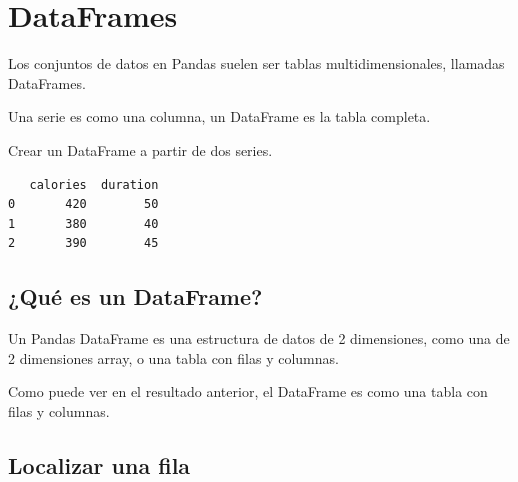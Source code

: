 \section{DataFrames}

Los conjuntos de datos en Pandas suelen ser tablas multidimensionales, llamadas DataFrames.

Una serie es como una columna, un DataFrame es la tabla completa. \\

\begin{code} Crear un DataFrame a partir de dos series.

\begin{Shaded}
\begin{Highlighting}[]

\OperatorTok{=}\NormalTok{ \{}
  \NormalTok{: [}\NormalTok{, }\NormalTok{, }\NormalTok{],}
  \NormalTok{: [}\NormalTok{, }\NormalTok{, }\NormalTok{]}
\NormalTok{\}}

\OperatorTok{=}

\end{Highlighting}
\end{Shaded}

\begin{verbatim}
   calories  duration
0       420        50
1       380        40
2       390        45
\end{verbatim}
\end{code}

\subsection{¿Qué es un DataFrame?}

Un Pandas DataFrame es una estructura de datos de 2 dimensiones, como
una de 2 dimensiones array, o una tabla con filas y columnas.

Como puede ver en el resultado anterior, el DataFrame es como una tabla
con filas y columnas.

\subsection{Localizar una fila}


